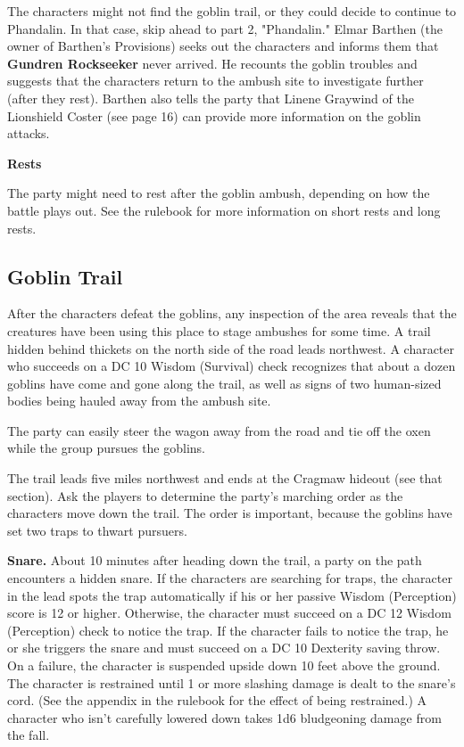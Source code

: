 \documentclass[10pt,a4paper,twoside,bg=print,twocolumn,openany,nodeprecatedcode]{dndbook}
\begin{document}
The characters might not find the goblin trail, or they could decide to continue to Phandalin. In that case, skip ahead to part 2, "Phandalin." Elmar Barthen (the owner of Barthen's Provisions) seeks out the characters and informs them that \textbf{Gundren Rockseeker} never arrived. He recounts the goblin troubles and suggests that the characters return to the ambush site to investigate further (after they rest). Barthen also tells the party that Linene Graywind of the Lionshield Coster (see page 16) can provide more information on the goblin attacks.

\textbf{Rests}

The party might need to rest after the goblin ambush, depending on how the battle plays out. See the rulebook for more information on short rests and long rests.

\subsection{Goblin Trail}
After the characters defeat the goblins, any inspection of the area reveals that the creatures have been using this place to stage ambushes for some time. A trail hidden behind thickets on the north side of the road leads northwest. A character who succeeds on a DC 10 Wisdom (Survival) check recognizes that about a dozen goblins have come and gone along the trail, as well as signs of two human-sized bodies being hauled away from the ambush site.

The party can easily steer the wagon away from the road and tie off the oxen while the group pursues the goblins.

The trail leads five miles northwest and ends at the Cragmaw hideout (see that section). Ask the players to determine the party's marching order as the characters move down the trail. The order is important, because the goblins have set two traps to thwart pursuers.

\textbf{Snare.} About 10 minutes after heading down the trail, a party on the path encounters a hidden snare. If the characters are searching for traps, the character in the lead spots the trap automatically if his or her passive Wisdom (Perception) score is 12 or higher. Otherwise, the character must succeed on a DC 12 Wisdom (Perception) check to notice the trap. If the character fails to notice the trap, he or she triggers the snare and must succeed on a DC 10 Dexterity saving throw. On a failure, the character is suspended upside down 10 feet above the ground. The character is restrained until 1 or more slashing damage is dealt to the snare's cord. (See the appendix in the rulebook for the effect of being restrained.) A character who isn't carefully lowered down takes 1d6 bludgeoning damage from the fall.
\end{document}
